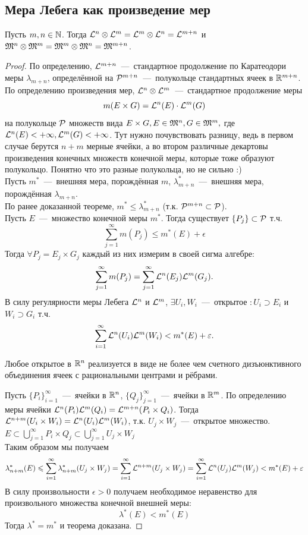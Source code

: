 \subsection{Мера Лебега как произведение мер}
\begin{theorem}
    Пусть $m, n \in \mathbb{N}$. Тогда $\mathcal{L}^n \otimes \mathcal{L}^m = \mathcal{L}^m \otimes \mathcal{L}^n = \mathcal{L}^{m + n}$ и $\mathfrak{M}^n \otimes \mathfrak{M}^m = \mathfrak{M}^m \otimes \mathfrak{M}^n = \mathfrak{M}^{m + n}$.
\end{theorem}
\begin{proof}
    По определению, $\mathcal{L}^{m + n}$~---~стандартное продолжение по Каратеодори меры $\lambda_{m + n}$, определённой на $\mathcal{P}^{m + n}$~---~полукольце стандартных ячеек в $\mathbb{R}^{m + n}$. \\
    По определению произведения мер, $\mathcal{L}^n \otimes \mathcal{L}^m$~---~стандартное продолжение меры $$m(E \times G) = \mathcal{L}^n(E)\cdot\mathcal{L}^m(G)$$ на полукольце $\mathcal{P}$ множеств вида $E \times G, E \in \mathfrak{M}^n, G \in \mathfrak{M}^m,$ где $ \mathcal{L}^n(E) < +\infty, \mathcal{L}^m(G) < +\infty$. Тут нужно почувствовать разницу, ведь в первом случае берутся  $n+m$ мерные ячейки, а во втором различные декартовы произведения конечных множеств конечной меры, которые тоже образуют полукольцо. Понятно что это разные полукольца, но не сильно :) \\
    Пусть $m^*$~---~внешняя мера, порождённая $m$, $\lambda_{m + n}^*$~---~внешняя мера, порождённая $\lambda_{m + n}$. \\
    По ранее доказанной теореме, $m^* \leq \lambda_{m + n}^*$ (т.к. $\mathcal{P}^{m + n} \subset \mathcal{P}$). \\
    Пусть $E$~---~множество конечной меры $m^*$. Тогда существует $\{P_j\} \subset \mathcal{P}$ т.ч. \[\sum\limits_{j = 1}^\infty m(P_j) \leq m^*(E) + \epsilon\]
    Тогда $\forall P_j = E_j \times G_j$ каждый из них измерим в своей сигма алгебре:
    \[
    \sum\limits_{j = 1}^\infty m(P_j) =  \sum\limits_{j = 1}^\infty \mathcal{L}^n(E_j) \mathcal{L}^m(G_j).
    \]
    В силу регулярности меры Лебега $\mathcal{L}^n$ и $\mathcal{L}^m$, $\exists U_i, W_i$~---~открытое $:U_i\supset E_i$ и $W_i \supset G_i$ т.ч. \[\sum\limits_{i = 1}^\infty \mathcal{L}^n(U_i)\mathcal{L}^m(W_i) < m^*(E) + \varepsilon.\]
\begin{fact}
    Любое открытое в $\mathbb{R}^n$ реализуется в виде не более чем счетного дизъюнктивного объединения ячеек с рациональными центрами и рёбрами.
\end{fact}
    Пусть $\{P_i\}_{i = 1}^\infty$~---~ячейки в $\mathbb{R}^n$, $\{Q_j\}_{j = 1}^\infty$~---~ячейки в $\mathbb{R}^m$. По определению меры ячейки $\mathcal{L}^n(P_i)\mathcal{L}^m(Q_i) = \mathcal{L}^{m + n}(P_i \times Q_i)$. Тогда $\mathcal{L}^{n + m}(U_i \times W_i) = \mathcal{L}^n(U_i)\mathcal{L}^m(W_i)$, т.к. $U_j \times W_j$~---~открытое множество. $E \subset \bigcup_{j=1}^{\infty} P_i \times Q_j \subset \bigcup_{j=1}^{\infty} U_j \times W_j$   \\
    Таким образом мы получаем \[\lambda^*_{n+m}(E) \leqslant \sum\limits_{i = 1}^\infty \lambda^*_{n+m} (U_j \times W_j) = \sum\limits_{i = 1}^\infty \mathcal{L}^{n+m} (U_j \times W_j) = \sum\limits_{i = 1}^\infty \mathcal{L}^{n} (U_j) \mathcal{L}^{m}(W_j) <  m^*(E) +\varepsilon\]
    В силу произвольности $\epsilon > 0$  получаем необходимое неравенство для произвольного множества конечной внешней меры: \[\lambda^*(E) < m^*(E)\]
    Тогда $\lambda^* = m^*$ и теорема доказана.
\end{proof}


